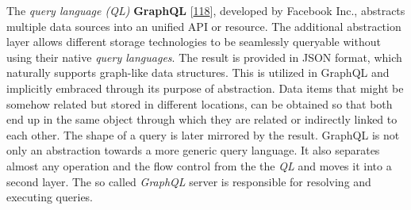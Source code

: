 \documentclass[12pt,english,a4paper,titlepage,cleardoublepage=empty,dottedtoc]{report}
\begin{document}
The \emph{query language (QL)}
\textbf{\protect\hypertarget{def--graphql}{}{GraphQL}}
{[}\protect\hyperlink{ref-web_spec_graphql}{118}{]}, developed by
Facebook Inc., abstracts multiple data sources into an unified API or
resource. The additional abstraction layer allows different storage
technologies to be seamlessly queryable without using their native
\emph{query languages}. The result is provided in JSON format, which
naturally supports graph-like data structures. This is utilized in
GraphQL and implicitly embraced through its purpose of abstraction. Data
items that might be somehow related but stored in different locations,
can be obtained so that both end up in the same object through which
they are related or indirectly linked to each other. The shape of a
query is later mirrored by the result. GraphQL is not only an
abstraction towards a more generic query language. It also separates
almost any operation and the flow control from the the \emph{QL} and
moves it into a second layer. The so called \emph{GraphQL} server is
responsible for resolving and executing queries.
\end{document}

